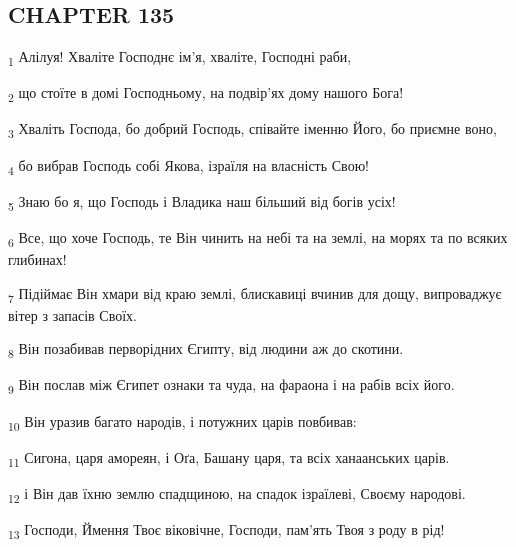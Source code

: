 \subsection{CHAPTER 135}
\begin{tcolorbox}
\textsubscript{1} Алілуя! Хваліте Господнє ім'я, хваліте, Господні раби,
\end{tcolorbox}
\begin{tcolorbox}
\textsubscript{2} що стоїте в домі Господньому, на подвір'ях дому нашого Бога!
\end{tcolorbox}
\begin{tcolorbox}
\textsubscript{3} Хваліть Господа, бо добрий Господь, співайте іменню Його, бо приємне воно,
\end{tcolorbox}
\begin{tcolorbox}
\textsubscript{4} бо вибрав Господь собі Якова, ізраїля на власність Свою!
\end{tcolorbox}
\begin{tcolorbox}
\textsubscript{5} Знаю бо я, що Господь і Владика наш більший від богів усіх!
\end{tcolorbox}
\begin{tcolorbox}
\textsubscript{6} Все, що хоче Господь, те Він чинить на небі та на землі, на морях та по всяких глибинах!
\end{tcolorbox}
\begin{tcolorbox}
\textsubscript{7} Підіймає Він хмари від краю землі, блискавиці вчинив для дощу, випроваджує вітер з запасів Своїх.
\end{tcolorbox}
\begin{tcolorbox}
\textsubscript{8} Він позабивав перворідних Єгипту, від людини аж до скотини.
\end{tcolorbox}
\begin{tcolorbox}
\textsubscript{9} Він послав між Єгипет ознаки та чуда, на фараона і на рабів всіх його.
\end{tcolorbox}
\begin{tcolorbox}
\textsubscript{10} Він уразив багато народів, і потужних царів повбивав:
\end{tcolorbox}
\begin{tcolorbox}
\textsubscript{11} Сигона, царя амореян, і Оґа, Башану царя, та всіх ханаанських царів.
\end{tcolorbox}
\begin{tcolorbox}
\textsubscript{12} і Він дав їхню землю спадщиною, на спадок ізраїлеві, Своєму народові.
\end{tcolorbox}
\begin{tcolorbox}
\textsubscript{13} Господи, Ймення Твоє віковічне, Господи, пам'ять Твоя з роду в рід!
\end{tcolorbox}
